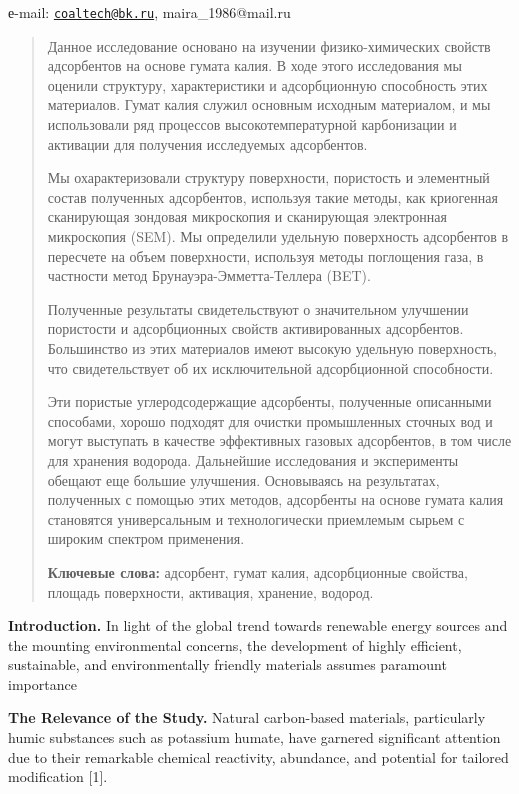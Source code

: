 е-mail: \href{mailto:coaltech@bk.ru}{\nolinkurl{coaltech@bk.ru}},
maira\_1986@mail.ru

\begin{quote}
Данное исследование основано на изучении физико-химических свойств
адсорбентов на основе гумата калия. В ходе этого исследования мы оценили
структуру, характеристики и адсорбционную способность этих материалов.
Гумат калия служил основным исходным материалом, и мы использовали ряд
процессов высокотемпературной карбонизации и активации для получения
исследуемых адсорбентов.

Мы охарактеризовали структуру поверхности, пористость и элементный
состав полученных адсорбентов, используя такие методы, как криогенная
сканирующая зондовая микроскопия и сканирующая электронная микроскопия
(SEM). Мы определили удельную поверхность адсорбентов в пересчете на
объем поверхности, используя методы поглощения газа, в частности метод
Брунауэра-Эмметта-Теллера (BET).

Полученные результаты свидетельствуют о значительном улучшении
пористости и адсорбционных свойств активированных адсорбентов.
Большинство из этих материалов имеют высокую удельную поверхность, что
свидетельствует об их исключительной адсорбционной способности.

Эти пористые углеродсодержащие адсорбенты, полученные описанными
способами, хорошо подходят для очистки промышленных сточных вод и могут
выступать в качестве эффективных газовых адсорбентов, в том числе для
хранения водорода. Дальнейшие исследования и эксперименты обещают еще
большие улучшения. Основываясь на результатах, полученных с помощью этих
методов, адсорбенты на основе гумата калия становятся универсальным и
технологически приемлемым сырьем с широким спектром применения.

{\bfseries Ключевые слова:} адсорбент, гумат калия, адсорбционные свойства,
площадь поверхности, активация, хранение, водород.
\end{quote}

{\bfseries Introduction.} In light of the global trend towards renewable
energy sources and the mounting environmental concerns, the development
of highly efficient, sustainable, and environmentally friendly materials
assumes paramount importance

{\bfseries The Relevance of the Study.} Natural carbon-based materials,
particularly humic substances such as potassium humate, have garnered
significant attention due to their remarkable chemical reactivity,
abundance, and potential for tailored modification {[}1{]}.

